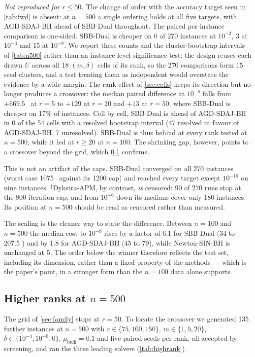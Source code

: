 \emph{Not reproduced for $r\le50$.} The change of order with the accuracy target seen in
\cref{tab:fwd} is absent: at $n=500$ a single ordering holds at all five
targets, with AGD-SDAJ-BH ahead of SBB-Dual throughout. The paired
per-instance comparison is one-sided. SBB-Dual is cheaper on 0 of 270
instances at $10^{-2}$, 3 at $10^{-4}$ and 15 at $10^{-8}$. We report
these counts and the cluster-bootstrap intervals of \cref{tab:n500} rather
than an instance-level significance test: the design reuses each drawn $U$
across all 18 $(m,\delta)$ cells of its rank, so the 270 comparisons form 15
seed clusters, and a test treating them as independent would overstate
the evidence by a wide margin. The rank effect of \cref{sec:cells} keeps its
direction but no longer produces a crossover: the median paired difference at
$10^{-8}$ falls from $+669.5$ \EVDs\ at $r=5$ to $+129$ at $r=20$ and $+13$ at
$r=50$, where SBB-Dual is cheaper on 17\% of instances. Cell by cell, SBB-Dual
is ahead of AGD-SDAJ-BH in 0 of the 54 cells with a resolved bootstrap
interval (47 resolved in favour of AGD-SDAJ-BH, 7 unresolved). SBB-Dual is thus
behind at every rank tested at $n=500$, while it led at $r\ge20$ at $n=100$.
The shrinking gap, however, points to a crossover beyond the grid, which
\cref{sec:highrank} confirms.

This is not an artifact of the caps. SBB-Dual converged on all 270 instances
(worst case 1075 \EVDs\ against its 1200 cap) and reached every target except
$10^{-10}$ on nine instances. $^{\ddagger}$Dykstra-APM, by contrast, \emph{is}
censored: 90 of 270 runs stop at the 800-iteration cap, and from $10^{-6}$
down its medians cover only 180 instances. Its position at $n=500$ should be
read as censored rather than measured.

The scaling is the cleaner way to state the difference. Between $n=100$ and
$n=500$ the median cost to $10^{-8}$ rises by a factor of 6.1 for SBB-Dual
(34 to 207.5 \EVDs) and by 1.8 for AGD-SDAJ-BH (45 to 79), while Newton-SIN-BH
is unchanged at 5. The order below the winner therefore reflects the test set,
including its dimension, rather than a fixed property of the methods --- which
is the paper's point, in a stronger form than the $n=100$ data alone supports.

\subsection{Higher ranks at $n=500$}\label{sec:highrank}
The grid of \cref{sec:family} stops at $r=50$. To locate the crossover we
generated 135 further instances at $n=500$ with $r\in\{75,100,150\}$,
$m\in\{1,5,20\}$, $\delta\in\{10^{-4},10^{-8},0\}$, $\mu_{\mathrm{bulk}}=0.1$
and five paired seeds per rank, all accepted by screening, and ran the three
leading solvers (\cref{tab:highrank}).

